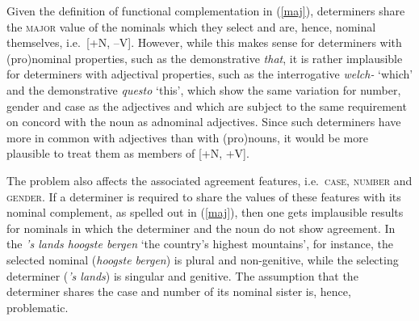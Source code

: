 \documentclass[output=paper,biblatex,babelshorthands,newtxmath,draftmode,colorlinks,citecolor=brown]{langscibook}
\begin{document}
\largerpage
Given the definition of functional complementation in (\ref{maj}), 
determiners share the \textsc{major} value of the nominals which they select
and are, hence, nominal themselves, i.e.\ [+N, --V].
However, while this makes sense for determiners with (pro)nominal properties,
such as the  demonstrative \emph{that}, 
it is rather implausible for determiners with adjectival properties,
such as the  interrogative \emph{welch-} `which' and 
the  demonstrative \emph{questo} `this', which show the same variation for 
number, gender and case as the adjectives and which are subject to 
the same requirement on concord with the noun as adnominal adjectives. 
Since such determiners have more in common with adjectives than with (pro)nouns,  
it would be more plausible to treat them as members of [+N, +V].  

The problem also affects the associated agreement features, i.e.\ \textsc{case}, 
\textsc{number} and \textsc{gender}. If a determiner 
is required to share the values of these features with its nominal complement,
as spelled out in (\ref{maj}), then one gets implausible results for nominals in 
which the determiner and the noun do not show agreement.    
In the  \emph{'s lands hoogste bergen} `the country's highest mountains', 
for instance, the selected nominal (\emph{hoogste bergen}) is plural and non-genitive, 
while the selecting determiner (\emph{'s lands}) is singular and genitive.  
The assumption that the determiner shares the case and number of its nominal sister 
is, hence, problematic.
\end{document}
